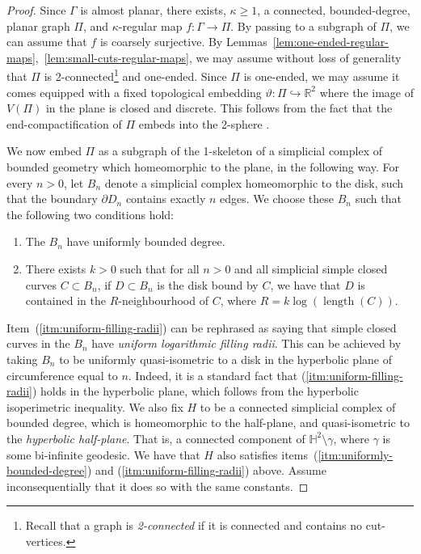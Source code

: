 \documentclass[11pt,a4paper]{amsart}
\DeclareMathOperator{\length}{length}
\newcommand{\R}{\mathbb{R}}
\newcommand{\bbH}{\mathbb{H}}
\newcommand{\into}{\hookrightarrow}
\theoremstyle{definition}
\begin{document}
\begin{proof}
    Since $\Gamma$ is almost planar, there exists, $\kappa \geq 1$, a connected, bounded-degree, planar graph $\Pi$, and $\kappa$-regular map $f : \Gamma \to \Pi$. By passing to a subgraph of $\Pi$, we can assume that $f$ is coarsely surjective.
    By Lemmas~\ref{lem:one-ended-regular-maps},~\ref{lem:small-cuts-regular-maps}, we may assume without loss of generality that $\Pi$ is 2-connected\footnote{Recall that a graph is \emph{2-connected} if it is connected and contains no cut-vertices.} and one-ended. Since $\Pi$ is one-ended, we may assume it comes equipped with a fixed topological embedding $\vartheta : \Pi \into \R^2$ where the image of $V(\Pi)$ in the plane is closed and discrete. This follows from the fact that the end-compactification of $\Pi$ embeds into the 2-sphere {\cite[Lem.~12]{richter20023}}. 


    We now embed $\Pi$ as a subgraph of the 1-skeleton of a simplicial complex of bounded geometry which homeomorphic to the plane, in the following way.
    For every $n > 0$, let $B_n$ denote a simplicial complex homeomorphic to the disk, such that the boundary $\partial D_n$ contains exactly $n$ edges. We choose these $B_n$ such that the following two conditions hold:
    \begin{enumerate}
        \item\label{itm:uniformly-bounded-degree} The $B_n$ have uniformly bounded degree.

		\item\label{itm:uniform-filling-radii} There exists $k > 0$ such that for all $n > 0$ and all simplicial simple closed curves $C \subset B_n$, if $D \subset B_n$ is the disk bound by $C$, we have that $D$ is contained in the $R$-neighbourhood of $C$, where $R = k \log(\length(C))$. 
    \end{enumerate}

    Item~(\ref{itm:uniform-filling-radii}) can be rephrased as saying that simple closed curves in the $B_n$ have \emph{uniform logarithmic filling radii}.
    This can be achieved by taking $B_n$ to be uniformly quasi-isometric to a disk in the hyperbolic plane of circumference equal to $n$. Indeed, it is a standard fact that (\ref{itm:uniform-filling-radii}) holds in the hyperbolic plane, which follows from the hyperbolic isoperimetric inequality. 
    We also fix $H$ to be a connected simplicial complex of bounded degree, which is homeomorphic to the half-plane, and quasi-isometric to the \emph{hyperbolic half-plane}. That is, a connected component of $\bbH^2 \setminus \gamma$, where $\gamma$ is some bi-infinite geodesic. We have that $H$ also satisfies items~(\ref{itm:uniformly-bounded-degree}) and (\ref{itm:uniform-filling-radii}) above. Assume inconsequentially that it does so with the same constants.
    

\end{proof}
\end{document}
